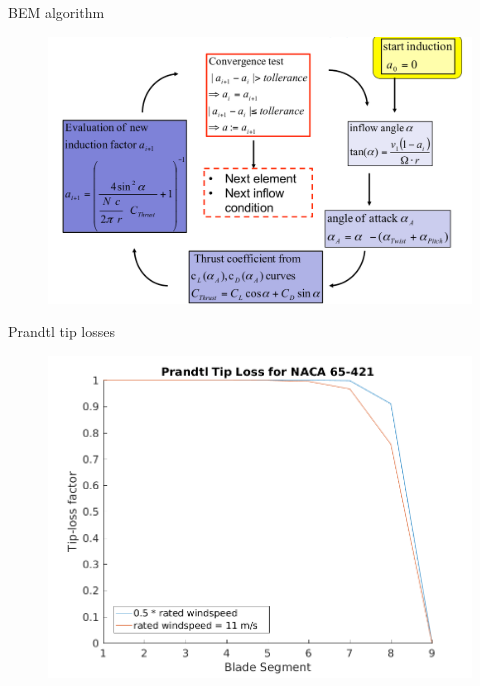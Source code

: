 \documentclass[12pt,t]{beamer}
\begin{document}
\begin{frame}
\huge
BEM algorithm
\begin{figure}[H]
\includegraphics[width=0.8\linewidth]{figures/algo.png}
\label{fig:blade_elemets}
\end{figure}
\end{frame}

\begin{frame}
\huge
Prandtl tip losses
\Tiny
\begin{figure}[H]
\centering
\includegraphics[width=0.8\linewidth]{../CIP_2/Figures/prandtl_tip_loss.png}
\end{figure}
\end{frame}
\end{document}
